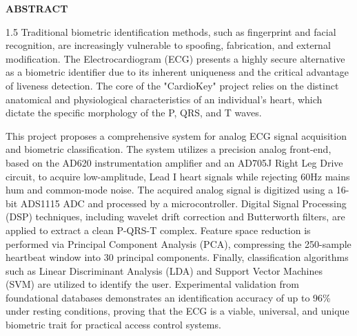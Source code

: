 \documentclass[12pt,a4paper]{report}
\begin{document}
\newpage
\begin{center}
\Large \textbf{ABSTRACT}\\[1cm]
\end{center}

\begin{spacing}{1.5}
\noindent Traditional biometric identification methods, such as fingerprint and facial recognition, are increasingly vulnerable to spoofing, fabrication, and external modification. The Electrocardiogram (ECG) presents a highly secure alternative as a biometric identifier due to its inherent uniqueness and the critical advantage of liveness detection. The core of the "CardioKey" project relies on the distinct anatomical and physiological characteristics of an individual's heart, which dictate the specific morphology of the P, QRS, and T waves. 

\noindent This project proposes a comprehensive system for analog ECG signal acquisition and biometric classification. The system utilizes a precision analog front-end, based on the AD620 instrumentation amplifier and an AD705J Right Leg Drive circuit, to acquire low-amplitude, Lead I heart signals while rejecting 60Hz mains hum and common-mode noise. The acquired analog signal is digitized using a 16-bit ADS1115 ADC and processed by a microcontroller. Digital Signal Processing (DSP) techniques, including wavelet drift correction and Butterworth filters, are applied to extract a clean P-QRS-T complex. Feature space reduction is performed via Principal Component Analysis (PCA), compressing the 250-sample heartbeat window into 30 principal components. Finally, classification algorithms such as Linear Discriminant Analysis (LDA) and Support Vector Machines (SVM) are utilized to identify the user. Experimental validation from foundational databases demonstrates an identification accuracy of up to 96\% under resting conditions, proving that the ECG is a viable, universal, and unique biometric trait for practical access control systems.
\end{spacing}

\newpage
\tableofcontents

\newpage
{}
\end{document}
